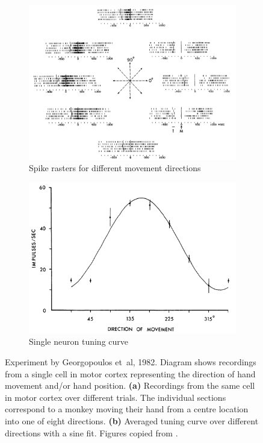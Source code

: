 \documentclass[10pt,letterpaper,oneside]{article}
\begin{document}
\begin{figure}
	\begin{subfigure}{0.5\textwidth}
		\centering
		\includegraphics[width=\textwidth]{media/georgopoulos_spike_raster.png}
		\caption{Spike rasters for different movement directions}
		\label{fig:georgopoulos_a}
	\end{subfigure}
	\begin{subfigure}{0.5\textwidth}
		\centering
		\includegraphics[width=\textwidth]{media/georgopoulos_tuning.png}
		\caption{Single neuron tuning curve}
		\label{fig:georgopoulos_b}
	\end{subfigure}
	\caption{Experiment by Georgopoulos et~al, 1982. Diagram shows recordings from a single cell in motor cortex representing the direction of hand movement and/or hand position. \textbf{(a)} Recordings from the same cell in motor cortex over different trials. The individual sections correspond to a monkey moving their hand from a centre location into one of eight directions. \textbf{(b)} Averaged tuning curve over different directions with a sine fit. Figures copied from \cite{georgopoulos1982relations}.}
	\label{fig:georgopoulos}
\end{figure}
\end{document}
